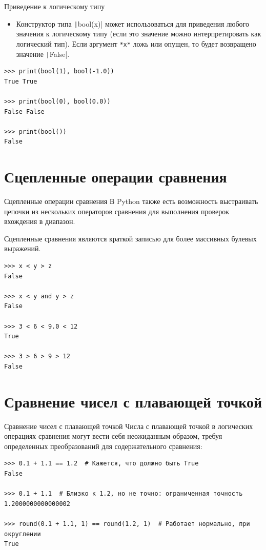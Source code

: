 \documentclass[aspectratio=169, mathserif]{beamer}	%
\begin{document}
\begin{frame}[fragile]{Приведение к логическому типу}
\scriptsize
\begin{itemize}
	\item Конструктор типа \texttt|bool(x)| может использоваться для приведения любого значения к логическому типу (если это значение можно интерпретировать как логический тип). Если аргумент \texttt{*x*} ложь или опущен, то будет возвращено значение \texttt|False|.
\end{itemize}

\begin{verbatim}
>>> print(bool(1), bool(-1.0))
True True

>>> print(bool(0), bool(0.0))
False False

>>> print(bool())
False
\end{verbatim}
\vfill
\end{frame}

\section{Сцепленные операции сравнения}
\sectionframe


\begin{frame}[fragile]{Сцепленные операции сравнения}
\scriptsize
В Python также есть возможность выстраивать цепочки из нескольких операторов сравнения для выполнения проверок вхождения в диапазон. 

Сцепленные сравнения являются краткой записью для более массивных булевых выражений.

\begin{verbatim}
>>> x < y > z
False

>>> x < y and y > z
False

>>> 3 < 6 < 9.0 < 12
True

>>> 3 > 6 > 9 > 12
False
\end{verbatim}
\vfill
\end{frame}


\section{Сравнение чисел с плавающей точкой}
\sectionframe


\begin{frame}[fragile]{Сравнение чисел с плавающей точкой}
\scriptsize
Числа с плавающей точкой в логических операциях сравнения могут вести себя неожиданным образом, требуя определенных преобразований для содержательного сравнения:

\begin{verbatim}
>>> 0.1 + 1.1 == 1.2  # Кажется, что должно быть True 
False

>>> 0.1 + 1.1  # Близко к 1.2, но не точно: ограниченная точность
1.2000000000000002

>>> round(0.1 + 1.1, 1) == round(1.2, 1)  # Работает нормально, при округлении
True
\end{verbatim}
\vfill
\end{frame}
\end{document}
